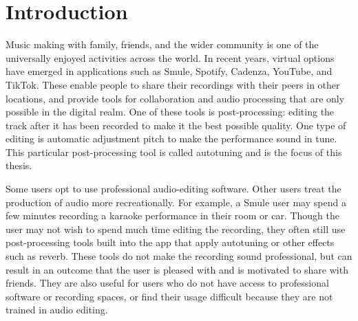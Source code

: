 \chapter{Introduction}
\label{sec:thesis-intro}
Music making with family, friends, and the wider community is one of the universally enjoyed activities across the world. In recent years, virtual options have emerged in applications such as Smule, Spotify, Cadenza, YouTube, and TikTok. These enable people to share their recordings with their peers in other locations, and provide tools for collaboration and audio processing that are only possible in the digital realm. One of these tools is post-processing: editing the track after it has been recorded to make it the best possible quality. One type of editing is automatic adjustment pitch to make the performance sound in tune. This particular post-processing tool is called autotuning and is the focus of this thesis. 

Some users opt to use professional audio-editing software. Other users treat the production of audio more recreationally. For example, a Smule user may spend a few minutes recording a karaoke performance in their room or car. Though the user may not wish to spend much time editing the recording, they often still use post-processing tools built into the app that apply autotuning or other effects such as reverb. These tools do not make the recording sound professional, but can result in an outcome that the user is pleased with and is motivated to share with friends. They are also useful for users who do not have access to professional software or recording spaces, or find their usage difficult because they are not trained in audio editing. 

